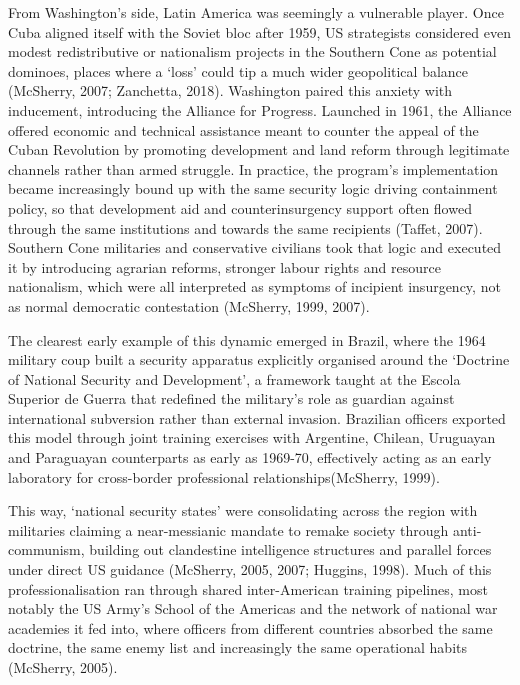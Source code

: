 From Washington’s side, Latin America was seemingly a vulnerable player. Once Cuba aligned itself with the Soviet bloc after 1959, US strategists considered even modest redistributive or nationalism projects in the Southern Cone as potential dominoes, places where a ‘loss’ could tip a much wider geopolitical balance (McSherry, 2007; Zanchetta, 2018). Washington paired this anxiety with inducement, introducing the Alliance for Progress. Launched in 1961, the Alliance offered economic and technical assistance meant to counter the appeal of the Cuban Revolution by promoting development and land reform through legitimate channels rather than armed struggle. In practice, the program’s implementation became increasingly bound up with the same security logic driving containment policy, so that development aid and counterinsurgency support often flowed through the same institutions and towards the same recipients (Taffet, 2007). Southern Cone militaries and conservative civilians took that logic and executed it by introducing agrarian reforms, stronger labour rights and resource nationalism, which were all interpreted as symptoms of incipient insurgency, not as normal democratic contestation (McSherry, 1999, 2007).

The clearest early example of this dynamic emerged in Brazil, where the 1964 military coup built a security apparatus explicitly organised around the ‘Doctrine of National Security and Development’, a framework taught at the Escola Superior de Guerra that redefined the military’s role as guardian against international subversion rather than external invasion. Brazilian officers exported this model through joint training exercises with Argentine, Chilean, Uruguayan and Paraguayan counterparts as early as 1969-70, effectively acting as an early laboratory for cross-border professional relationships(McSherry, 1999).

This way, ‘national security states’ were consolidating across the region with militaries claiming a near-messianic mandate to remake society through anti-communism, building out clandestine intelligence structures and parallel forces under direct US guidance (McSherry, 2005, 2007; Huggins, 1998). Much of this professionalisation ran through shared inter-American training pipelines, most notably the US Army’s School of the Americas and the network of national war academies it fed into, where officers from different countries absorbed the same doctrine, the same enemy list and increasingly the same operational habits (McSherry, 2005).

